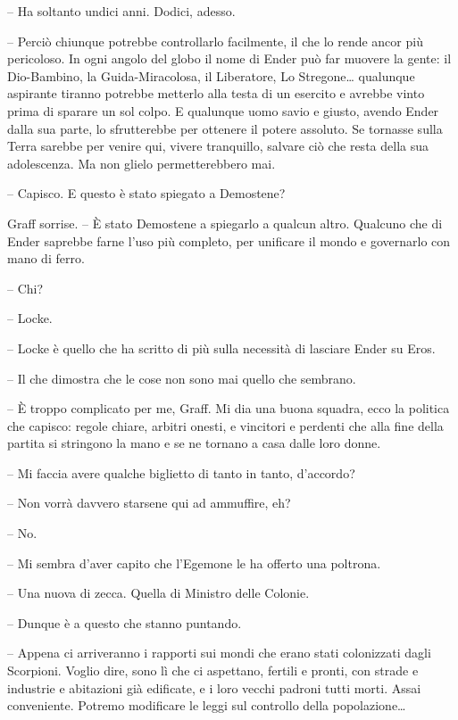 {-- Ha soltanto undici anni. Dodici, adesso.}

{-- Perciò chiunque potrebbe controllarlo facilmente, il che lo rende
	ancor più pericoloso. In ogni angolo del globo il nome di Ender può far
	muovere la gente: il Dio-Bambino, la Guida-Miracolosa, il Liberatore, Lo
	Stregone\ldots{} qualunque aspirante tiranno potrebbe metterlo alla
	testa di un esercito e avrebbe vinto prima di sparare un sol colpo. E
	qualunque uomo savio e giusto, avendo Ender dalla sua parte, lo
	sfrutterebbe per ottenere il potere assoluto. Se tornasse sulla Terra
	sarebbe per venire qui, vivere tranquillo, salvare ciò che resta della
	sua adolescenza. Ma non glielo permetterebbero mai.}

{-- Capisco. E questo è stato spiegato a Demostene?}

{Graff sorrise. -- È stato Demostene a spiegarlo a qualcun altro.
	Qualcuno che di Ender saprebbe farne l'uso più completo, per unificare
	il mondo e governarlo con mano di ferro.}

{-- Chi?}

{-- Locke.}

{-- Locke è quello che ha scritto di più sulla necessità di lasciare
	Ender su Eros.}

{-- Il che dimostra che le cose non sono mai quello che sembrano.}

{-- È troppo complicato per me, Graff. Mi dia una buona squadra, ecco la
	politica che capisco: regole chiare, arbitri onesti, e vincitori e
	perdenti che alla fine della partita si stringono la mano e se ne
	tornano a casa dalle loro donne.}

{-- Mi faccia avere qualche biglietto di tanto in tanto, d'accordo?}

{-- Non vorrà davvero starsene qui ad ammuffire, eh?}

{-- No.}

{-- Mi sembra d'aver capito che l'Egemone le ha offerto una poltrona.}

{-- Una nuova di zecca. Quella di Ministro delle Colonie.}

{-- Dunque è a questo che stanno puntando.}

{-- Appena ci arriveranno i rapporti sui mondi che erano stati
	colonizzati dagli Scorpioni. Voglio dire, sono lì che ci aspettano,
	fertili e pronti, con strade e industrie e abitazioni già edificate, e i
	loro vecchi padroni tutti morti. Assai conveniente. Potremo modificare
	le leggi sul controllo della popolazione\ldots{}}

